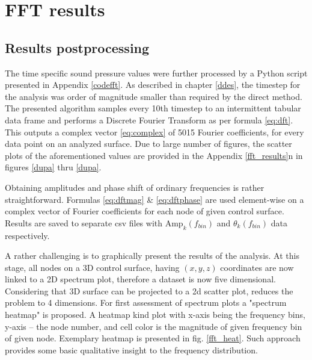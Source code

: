 
\section{FFT results} \label{fft}

\subsection{Results postprocessing} \label{fft_res_prep}
The time specific sound pressure values were further processed by a Python script presented in Appendix \ref{codefft}. As described in chapter \ref{ddes}, the timestep for the analysis was order of magnitude smaller than required by the direct method. The presented algorithm samples every 10th timestep to an intermittent tabular data frame and performs a Discrete Fourier Transform as per formula \ref{eq:dft}. This outputs a complex vector \ref{eq:complex} of 5015 Fourier coefficients, for every data point on an analyzed surface. Due to large number of figures, the scatter plots of the aforementioned values are provided in the Appendix \ref{fft_results}n in figures \ref{dupa} thru \ref{dupa}.


Obtaining amplitudes and phase shift of ordinary frequencies is rather straightforward. Formulas \ref{eq:dftmag} \& \ref{eq:dftphase} are used element-wise on a complex vector of Fourier coefficients for each node of given control surface. Results are saved to separate csv files with $\text{Amp}_k(f_{bin})$ and $\theta_k(f_{bin})$ data respectively.

A rather challenging is to graphically present the results of the analysis. At this stage, all nodes on a 3D control surface, having $(x, y, z)$ coordinates are now linked to a 2D spectrum plot, therefore a dataset is now five dimensional. Considering that 3D surface can be projected to a 2d scatter plot, reduces the problem to 4 dimensions. For first assessment of spectrum plots a "spectrum heatmap" is proposed. A heatmap kind plot with x-axis being the frequency bins, y-axis -- the node number, and cell color is the magnitude of given frequency bin of given node. Exemplary heatmap is presented in fig. \ref{fft_heat}. Such approach provides some basic qualitative insight to the frequency distribution.

